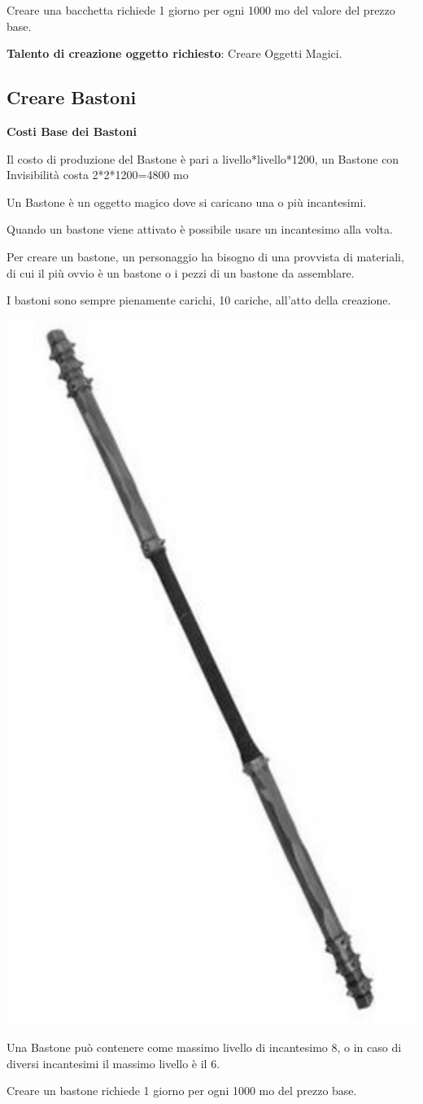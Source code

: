 \begin{multicols}{2}
	Creare una bacchetta richiede 1 giorno per ogni 1000 mo del valore del prezzo base.

	\medskip

	\textbf{Talento di creazione oggetto richiesto}: Creare Oggetti Magici.

	\subsection{Creare Bastoni}

	\textbf{Costi Base dei Bastoni}

	\bigskip

	Il costo di produzione del Bastone è pari a livello*livello*1200, un Bastone con Invisibilità costa 2*2*1200=4800 mo

	\bigskip

	Un Bastone è un oggetto magico dove si caricano una o più incantesimi.

	Quando un bastone viene attivato è possibile usare un incantesimo alla volta.

	Per creare un bastone, un personaggio ha bisogno di una provvista di materiali, di cui il più ovvio è un bastone o i pezzi di un bastone da assemblare.

	I bastoni sono sempre pienamente carichi, 10 cariche, all'atto della creazione.

	\begin{center}
		\includegraphics[width=0.3\linewidth]{immagini/staff2.png}
	\end{center}

	Una Bastone può contenere come massimo livello di incantesimo 8, o in caso di diversi incantesimi il massimo livello è il 6.

	Creare un bastone richiede 1 giorno per ogni 1000 mo del prezzo base.

	\medskip


\end{multicols}
